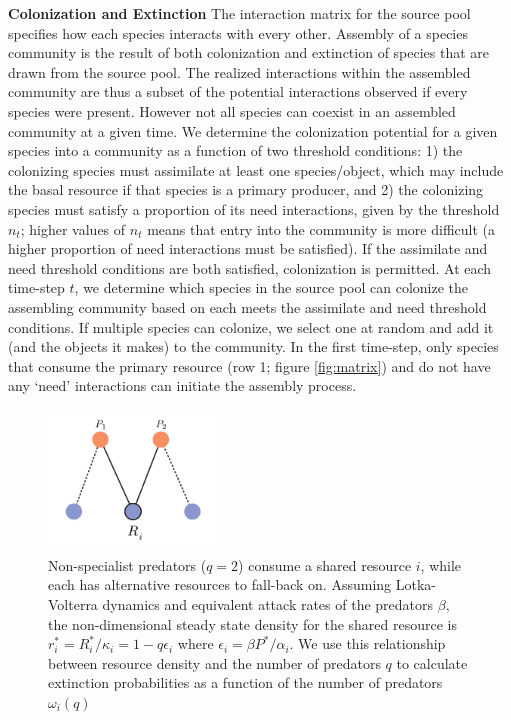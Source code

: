 \documentclass[twocolumn,preprintnumbers,amsmath,amssymb,superscriptaddress]{revtex4}
\begin{document}
\textbf{Colonization and Extinction} The interaction matrix for the source pool specifies how each species interacts with every other.
Assembly of a species community is the result of both colonization and extinction of species that are drawn from the source pool.
The realized interactions within the assembled community are thus a subset of the potential interactions observed if every species were present.
However not all species can coexist in an assembled community at a given time.
We determine the colonization potential for a given species into a community as a function of two threshold conditions:
1) the colonizing species must assimilate at least one species/object, which may include the basal resource if that species is a primary producer, and
2) the colonizing species must satisfy a proportion of its need interactions, given by the threshold $n_t$; higher values of $n_t$ means that entry into the community is more difficult (a higher proportion of need interactions must be satisfied).
If the assimilate and need threshold conditions are both satisfied, colonization is permitted.
At each time-step $t$, we determine which species in the source pool can colonize the assembling community based on each meets the assimilate and need threshold conditions.
If multiple species can colonize, we select one at random and add it (and the objects it makes) to the community.
In the first time-step, only species that consume the primary resource (row 1; figure \ref{fig:matrix}) and do not have any `need' interactions can initiate the assembly process.

\begin{figure}
\centering
\includegraphics[width=0.4\textwidth]{predpreymotif.pdf}
\caption{
Non-specialist predators ($q=2$) consume a shared resource $i$, while each has alternative resources to fall-back on. Assuming Lotka-Volterra dynamics and equivalent attack rates of the predators $\beta$, the non-dimensional steady state density for the shared resource is $r_i^* = R_i^*/\kappa_i=1 - q\epsilon_i$ where $\epsilon_i=\beta P^*/\alpha_i$. We use this relationship between resource density and the number of predators $q$ to calculate extinction probabilities as a function of the number of predators $\omega_i(q)$
}
\label{fig:lv}
\end{figure} 
\end{document}
